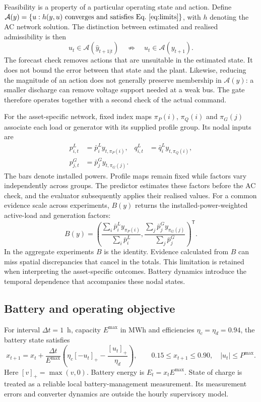 \documentclass[preprint,12pt]{elsarticle}
\newcommand{\pos}[1]{[#1]_{+}}
\begin{document}
Feasibility is a property of a particular operating state and action. Define $\mathcal A(y)=\{u:h(y,u)\text{ converges and satisfies Eq.~\eqref{eq:limits}}\}$, with $h$ denoting the AC network solution. The distinction between estimated and realised admissibility is then
\begin{equation}
u_t\in\mathcal A(\widehat y_{t+1|t})
\quad\not\Rightarrow\quad
u_t\in\mathcal A(y_{t+1}).
\label{eq:modelplant}
\end{equation}
The forecast check removes actions that are unsuitable in the estimated state. It does not bound the error between that state and the plant. Likewise, reducing the magnitude of an action does not generally preserve membership in $\mathcal A(y)$: a smaller discharge can remove voltage support needed at a weak bus. The gate therefore operates together with a second check of the actual command.


For the asset-specific network, fixed index maps $\pi_P(i)$, $\pi_Q(i)$ and $\pi_G(j)$ associate each load or generator with its supplied profile group. Its nodal inputs are
\begin{align}
p_{i,t}^{L}&=\bar p_i^{L}y_{t,\pi_P(i)}, & q_{i,t}^{L}&=\bar q_i^{L}y_{t,\pi_Q(i)},\label{eq:assetloads}\\
p_{j,t}^{G}&=\bar p_j^{G}y_{t,\pi_G(j)}.\label{eq:assetgeneration}
\end{align}
The bars denote installed powers. Profile maps remain fixed while factors vary independently across groups. The predictor estimates these factors before the AC check, and the evaluator subsequently applies their realised values. For a common evidence scale across experiments, $B(y)$ returns the installed-power-weighted active-load and generation factors:
\begin{equation}
B(y)=\left(\frac{\sum_i\bar p_i^{L}y_{\pi_P(i)}}{\sum_i\bar p_i^{L}},
\frac{\sum_j\bar p_j^{G}y_{\pi_G(j)}}{\sum_j\bar p_j^{G}}\right)^{\mathsf T}.
\label{eq:aggregation}
\end{equation}
In the aggregate experiments $B$ is the identity. Evidence calculated from $B$ can miss spatial discrepancies that cancel in the totals. This limitation is retained when interpreting the asset-specific outcomes. Battery dynamics introduce the temporal dependence that accompanies these nodal states.

\subsection{Battery and operating objective}
For interval $\Delta t=1$~h, capacity $E^{\max}$ in MWh and efficiencies $\eta_c=\eta_d=0.94$, the battery state satisfies
\begin{equation}
x_{t+1}=x_t+\frac{\Delta t}{E^{\max}}\left(\eta_c\pos{-u_t}-\frac{\pos{u_t}}{\eta_d}\right),\qquad
0.15\leq x_{t+1}\leq0.90,\quad |u_t|\leq P^{\max}.
\label{eq:soc}
\end{equation}
Here $\pos{v}=\max(v,0)$. Battery energy is $E_t=x_tE^{\max}$. State of charge is treated as a reliable local battery-management measurement. Its measurement errors and converter dynamics are outside the hourly supervisory model.
\end{document}
